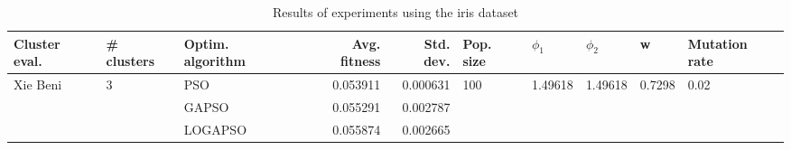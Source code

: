 \begin{table}
\centering
\caption{Results of experiments using the iris dataset}
\begin{tabular}{lllrrlllll}
\toprule
            Cluster eval. &        \# clusters & Optim. algorithm &  Avg. fitness &  Std. dev. &            Pop. size &               $\phi_{1}$ &               $\phi_{2}$ &                       w &         Mutation rate \\
\midrule
\multirow{3}{*}{Xie Beni} & \multirow{3}{*}{3} &              PSO &      0.053911 &   0.000631 & \multirow{3}{*}{100} & \multirow{3}{*}{1.49618} & \multirow{3}{*}{1.49618} & \multirow{3}{*}{0.7298} & \multirow{3}{*}{0.02} \\
                          &                    &            GAPSO &      0.055291 &   0.002787 &                      &                          &                          &                         &                       \\
                          &                    &          LOGAPSO &      0.055874 &   0.002665 &                      &                          &                          &                         &                       \\
\bottomrule
\end{tabular}
\end{table}
